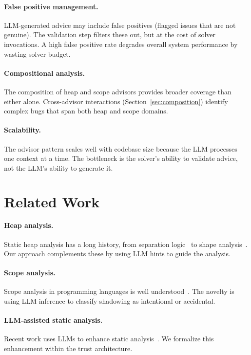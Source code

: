 \documentclass[11pt]{article}
\begin{document}
\paragraph{False positive management.}
LLM-generated advice may include false positives (flagged issues
that are not genuine).  The validation step filters these out,
but at the cost of solver invocations.  A high false positive
rate degrades overall system performance by wasting solver budget.

\paragraph{Compositional analysis.}
The composition of heap and scope advisors provides broader
coverage than either alone.  Cross-advisor interactions
(Section~\ref{sec:composition}) identify complex bugs that
span both heap and scope domains.

\paragraph{Scalability.}
The advisor pattern scales well with codebase size because the
LLM processes one context at a time.  The bottleneck is the
solver's ability to validate advice, not the LLM's ability to
generate it.

\section{Related Work}
\label{sec:related}

\paragraph{Heap analysis.}
Static heap analysis has a long history, from separation
logic~\cite{reynolds2002separation} to shape
analysis~\cite{sagiv2002parametric}.  Our approach complements
these by using LLM hints to guide the analysis.

\paragraph{Scope analysis.}
Scope analysis in programming languages is well
understood~\cite{aho2006compilers}.  The novelty is using
LLM inference to classify shadowing as intentional or accidental.

\paragraph{LLM-assisted static analysis.}
Recent work uses LLMs to enhance static
analysis~\cite{chen2021codex,li2022competition}.
We formalize this enhancement within the trust architecture.
\end{document}

